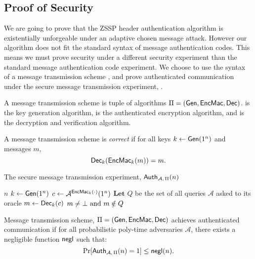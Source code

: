 \documentclass{article}
\begin{document}
\subsection{Proof of Security}

We are going to prove that the ZSSP header authentication algorithm is existentially unforgeable under an adaptive chosen message attack. However our algorithm does not fit the standard syntax of message authentication codes. This means we must prove security under a different security experiment than the standard message authentication code experiment. We choose to use the syntax of a message transmission scheme \cite{modern_crypto}, and prove authenticated communication under the secure message transmission experiment, .

\begin{definition}
	A message transmission scheme is tuple of algorithms $\Pi = (\text{\sf Gen}, \text{\sf EncMac}, \text{\sf Dec})$.  is the key generation algorithm,  is the authenticated encryption algorithm, and  is the decryption and verification algorithm.

	A message transmission scheme is \emph{correct} if for all keys $k\gets \text{\sf Gen}(1^n)$ and messages $m$,
	$$\text{\sf Dec}_k(\text{\sf EncMac}_k(m)) = m.$$
\end{definition}

\begin{algorithm}
	\caption{The secure message transmission experiment, $\text{\sf Auth}_{\mathcal{A},\, \Pi}(n)$ \cite{modern_crypto}}\label{alg:header_auth}
	\begin{algorithmic}
		\Require $n$
		\State $k \gets \text{\sf Gen}(1^n)$
		\State $c \gets \mathcal{A}^{\text{\sf EncMac}_k(\cdot)}(1^n)$
		\State $\textbf{Let } Q$ be the set of all queries $\mathcal{A}$ asked to its oracle
		\State $m \gets \text{\sf Dec}_k(c)$
		\Ensure $m \neq \bot \text{ and } m \notin Q$
	\end{algorithmic}
\end{algorithm}

\begin{definition}
	Message transmission scheme, $\Pi = (\text{\sf Gen}, \text{\sf EncMac}, \text{\sf Dec})$ achieves authenticated communication if for all probabilistic poly-time adversaries $\mathcal{A}$, there exists a negligible function $\text{\sf negl}$ such that:
	$$\text{Pr}[\text{\sf Auth}_{\mathcal{A},\, \Pi}(n) = 1] \leq \text{\sf negl}(n).$$
\end{definition}
\end{document}
